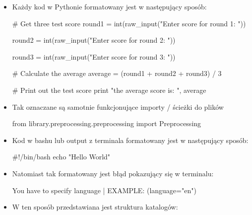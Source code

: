 \begin{itemize}
\item Każdy kod w Pythonie formatowany jest w następujący sposób:

\begin{python}
# Get three test score
round1 = int(raw_input("Enter score for round 1: "))

round2 = int(raw_input("Enter score for round 2: "))

round3 = int(raw_input("Enter score for round 3: "))
   
# Calculate the average
average = (round1 + round2 + round3) / 3

# Print out the test score
print "the average score is: ", average 

\end{python}

\item Tak oznaczane są samotnie funkcjonujące importy / ścieżki do plików
\begin{import}
from library.preprocessing.preprocessing import Preprocessing
\end{import}

\item Kod w bashu lub output z terminala formatowany jest w następujący sposób:

\begin{bash}
#!/bin/bash
echo "Hello World"
\end{bash}

\item Natomiast tak formatowany jest błąd pokazujący się w terminalu:
\begin{consolerror}
You have to specify language | EXAMPLE: (language="en")
\end{consolerror}



\item W ten sposób przedstawiana jest struktura katalogów:
\myspace
{}

\end{itemize}
